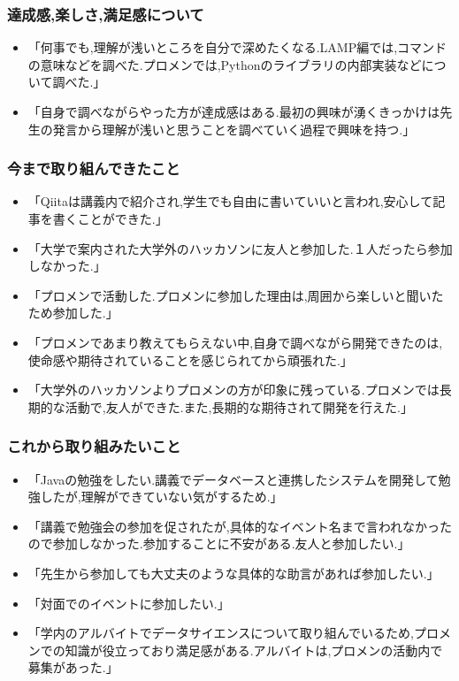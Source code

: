 \documentclass[11pt, a4paper]{jreport}
\begin{document}
\subsubsection{達成感,楽しさ,満足感について}

\begin{itemize}
\item 「何事でも,理解が浅いところを自分で深めたくなる.LAMP編では,コマンドの意味などを調べた.プロメンでは,Pythonのライブラリの内部実装などについて調べた.」
\item 「自身で調べながらやった方が達成感はある.最初の興味が湧くきっかけは先生の発言から理解が浅いと思うことを調べていく過程で興味を持つ.」
\end{itemize}

\subsubsection{今まで取り組んできたこと}

\begin{itemize}
\item 「Qiitaは講義内で紹介され,学生でも自由に書いていいと言われ,安心して記事を書くことができた.」
\item 「大学で案内された大学外のハッカソンに友人と参加した.１人だったら参加しなかった.」
\item 「プロメンで活動した.プロメンに参加した理由は,周囲から楽しいと聞いたため参加した.」
\item 「プロメンであまり教えてもらえない中,自身で調べながら開発できたのは,使命感や期待されていることを感じられてから頑張れた.」
\item 「大学外のハッカソンよりプロメンの方が印象に残っている.プロメンでは長期的な活動で,友人ができた.また,長期的な期待されて開発を行えた.」
\end{itemize}

\subsubsection{これから取り組みたいこと}

\begin{itemize}
\item 「Javaの勉強をしたい.講義でデータベースと連携したシステムを開発して勉強したが,理解ができていない気がするため.」
\item 「講義で勉強会の参加を促されたが,具体的なイベント名まで言われなかったので参加しなかった.参加することに不安がある.友人と参加したい.」
\item 「先生から参加しても大丈夫のような具体的な助言があれば参加したい.」
\item 「対面でのイベントに参加したい.」
\item 「学内のアルバイトでデータサイエンスについて取り組んでいるため,プロメンでの知識が役立っており満足感がある.アルバイトは,プロメンの活動内で募集があった.」
\end{itemize}
\end{document}
